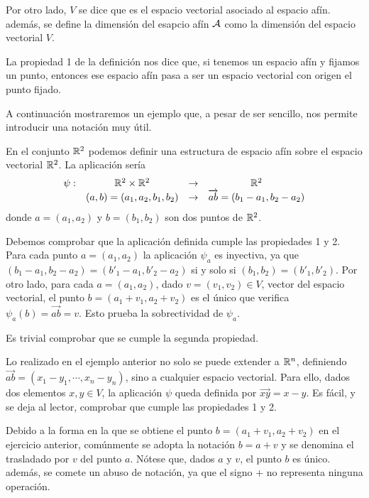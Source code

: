 Por otro lado, $V$ se dice que es el espacio vectorial asociado al espacio afín. además, se define la dimensión del esapcio afín $\mathcal{A}$ como la dimensión del espacio vectorial $V$.

La propiedad 1 de la definición nos dice que, si tenemos un espacio afín y fijamos un punto, entonces ese espacio afín pasa a ser un espacio vectorial con origen el punto fijado.

A continuación mostraremos un ejemplo que, a pesar de ser sencillo, nos permite introducir una notación muy útil.
\begin{exa}
	En el conjunto $\mathbb{R}^2$ podemos definir una estructura de espacio afín sobre el espacio vectorial $\mathbb{R}^2$. La aplicación sería 
	\begin{equation*}
		\begin{array}{cccc}
		\psi: & \mathbb{R}^2 \times \mathbb{R}^2 & \rightarrow &\mathbb{R}^2\\
		& (a,b)=(a_1,a_2,b_1,b_2) & \rightarrow & \overrightarrow{ab}=(b_1-a_1,b_2-a_2)
		\end{array}
	\end{equation*}
	donde $a=(a_1,a_2)$ y $b=(b_1,b_2)$ son dos puntos de $\mathbb{R}^2$.
	
	Debemos comprobar que la aplicación definida cumple las propiedades 1 y 2. Para cada punto $a=(a_1,a_2)$ la aplicación $\psi_a$ es inyectiva, ya que $(b_1-a_1,b_2-a_2)=(b'_1-a_1,b'_2-a_2)$ si y solo si $(b_1,b_2)=(b'_1,b'_2)$. Por otro lado, para cada $a=(a_1,a_2)$, dado $v=(v_1,v_2)\in V$, vector del espacio vectorial, el punto $b=(a_1+v_1,a_2+v_2)$ es el único que verifica $\psi_a(b)=\overrightarrow{ab}=v$. Esto prueba la sobrectividad de $\psi_a$.
	
	Es trivial comprobar que se cumple la segunda propiedad.
\end{exa} 
\begin{obs}
	Lo realizado en el ejemplo anterior no solo se puede extender a $\mathbb{R}^n$, definiendo $\overrightarrow{ab}=(x_1-y_1,\cdots,x_n-y_n)$, sino a cualquier espacio vectorial. Para ello, dados dos elementos $x,y\in V$, la aplicación $\psi$ queda definida por $\overrightarrow{xy}=x-y$. Es fácil, y se deja al lector, comprobar que cumple las propiedades 1 y 2.
\end{obs}
\begin{obs}[Notación]\label{c9_obs_notacion}
	Debido a la forma en la que se obtiene el punto $b=(a_1+v_1,a_2+v_2)$ en el ejercicio anterior, comúnmente se adopta la notación $b=a+v$ y se denomina el trasladado por $v$ del punto $a$. Nótese que, dados $a$ y $v$, el punto $b$ es único. además, se comete un abuso de notación, ya que el signo $+$ no representa ninguna operación.
\end{obs}

